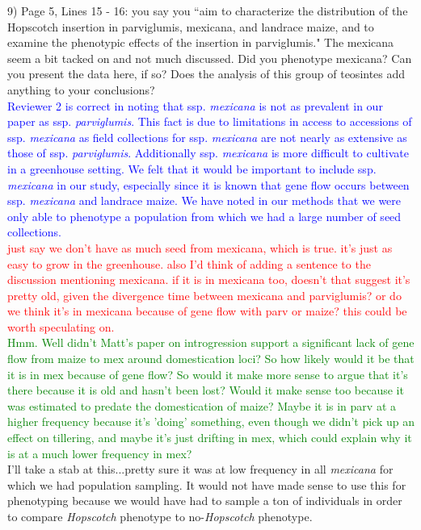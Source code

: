 \documentclass[11pt]{article}
\newcommand{\res}[1]{\noindent \textcolor{blue}{{#1}} \\}
\newcommand{\jri}[1]{\noindent \textcolor{red}{{#1}} \\}
\newcommand{\lev}[1]{\noindent \textcolor{green}{{#1}} \\}
\newcommand{\mbh}[1]{\noindent \textcolor{Dandelion}{{#1}}\\}
\begin{document}
9) Page 5, Lines 15 - 16: you say you ``aim to characterize the distribution of the Hopscotch insertion in parviglumis, mexicana, and landrace maize, and to examine the phenotypic effects of the insertion in parviglumis."  The mexicana seem a bit tacked on and not much discussed. Did you phenotype mexicana? Can you present the data here, if so? Does the analysis of this group of teosintes add anything to your conclusions?\\

\res{Reviewer 2 is correct in noting that ssp. \emph{mexicana} is not as prevalent in our paper as ssp. \emph{parviglumis}. This fact is due to limitations in access to accessions of ssp. \emph{mexicana} as field collections for ssp. \emph{mexicana} are not nearly as extensive as those of ssp. \emph{parviglumis}. Additionally ssp. \emph{mexicana} is more difficult to cultivate in a greenhouse setting. We felt that it would be important to include ssp. \emph{mexicana} in our study, especially since it is known that gene flow occurs between ssp. \emph{mexicana} and landrace maize. We have noted in our methods that we were only able to phenotype a population from which we had a large number of seed collections.} \jri{just say we don't have as much seed from mexicana, which is true. it's just as easy to grow in the greenhouse. also I'd think of adding a sentence to the discussion mentioning mexicana. if it is in mexicana too, doesn't that suggest it's pretty old, given the divergence time between mexicana and parviglumis? or do we think it's in mexicana because of gene flow with parv or maize? this could be worth speculating on.}
\lev{Hmm. Well didn't Matt's paper on introgression support a significant lack of gene flow from maize to mex around domestication loci? So how likely would it be that it is in mex because of gene flow? So would it make more sense to argue that it's there because it is old and hasn't been lost? Would it make sense too because it was estimated to predate the domestication of maize? Maybe it is in parv at a higher frequency because it's 'doing' something, even though we didn't pick up an effect on tillering, and maybe it's just drifting in mex, which could explain why it is at a much lower frequency in mex?}

\mbh{I'll take a stab at this...pretty sure it was at low frequency in all \emph{mexicana} for which we had population sampling.  It would not have made sense to use this for phenotyping because we would have had to sample a ton of individuals in order to compare \emph{Hopscotch} phenotype to no-\emph{Hopscotch} phenotype.}
\end{document}
